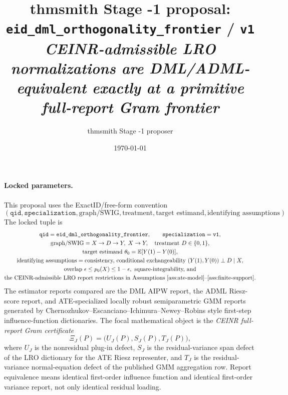 \documentclass[11pt]{article}
\title{thmsmith Stage -1 proposal: \texttt{eid\_dml\_orthogonality\_frontier} / \texttt{v1}%
  \\ \large\textit{CEINR-admissible LRO normalizations are DML/ADML-equivalent exactly at a primitive full-report Gram frontier}}
\author{thmsmith Stage -1 proposer}
\date{\today}
\newcommand{\E}{\mathbb{E}}
\theoremstyle{definition}
\theoremstyle{plain}
\theoremstyle{remark}
\begin{document}
\maketitle


\paragraph{Locked parameters.}
This proposal uses the ExactID/free-form convention
\[
(\texttt{qid},\texttt{specialization},\text{graph/SWIG},\text{treatment},
\text{target estimand},\text{identifying assumptions}).
\]
The locked tuple is
\[
\begin{gathered}
\texttt{qid}=\texttt{eid\_dml\_orthogonality\_frontier},\qquad
\texttt{specialization}=\texttt{v1},\\
\text{graph/SWIG}=X\to D\to Y,\; X\to Y,\quad
\text{treatment }D\in\{0,1\},\\
\text{target estimand }\theta_0=\E[Y(1)-Y(0)],\\
\text{identifying assumptions}=\text{consistency, conditional exchangeability }
(Y(1),Y(0))\perp D\mid X,\\
\text{overlap }\epsilon\le p_0(X)\le 1-\epsilon,\text{ square-integrability, and}\\
\text{the CEINR-admissible LRO report restrictions in
Assumptions \ref{ass:ate-model}--\ref{ass:finite-support}.}
\end{gathered}
\]
The estimator reports compared are the DML AIPW report, the ADML Riesz-score
report, and ATE-specialized locally robust semiparametric GMM reports generated
by Chernozhukov--Escanciano--Ichimura--Newey--Robins style first-step
influence-function dictionaries.  The focal mathematical object is the
\emph{CEINR full-report Gram certificate}
\[
\Xi_J(P)=\big(U_J(P),S_J(P),T_J(P)\big),
\]
where \(U_J\) is the nonresidual plug-in defect, \(S_J\) is the
residual-variance span defect of the LRO dictionary for the ATE Riesz
representer, and \(T_J\) is the residual-variance normal-equation defect of the
published GMM aggregation row.  Report equivalence means identical first-order
influence function and identical first-order variance report, not only
identical residual loading.
\end{document}
